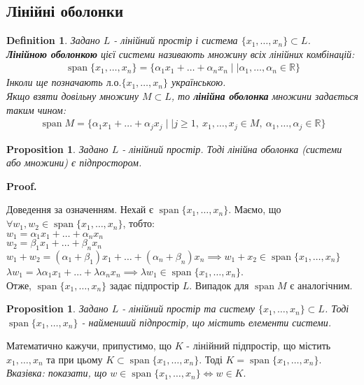 \documentclass[a4paper, 10pt]{article}
\makeatletter
\theoremstyle{theoremdd}
\newtheorem{definition}[theorem]{Definition}
\newtheorem{proposition}[theorem]{Proposition}
\DeclareMathOperator{\linspan}{span}
\renewenvironment{proof}[1][Proof.\\]{\par
\pushQED{\hfill \qed}%
\normalfont \topsep6\p@\@plus6\p@\relax
\trivlist
\item\relax
{\bfseries
#1\@addpunct{.}}\hspace\labelsep\ignorespaces
}{%
\popQED\endtrivlist\@endpefalse
}
\makeatother
\begin{document}
	\subsection{Лінійні оболонки}
	\begin{definition}
	Задано $L$ - лінійний простір і система $\{x_1, \dots, x_n\} \subset L$.\\
	\textbf{Лінійною оболонкою} цієї системи називають множину всіх лінійних комбінацій:
	\begin{align*}
	\linspan\{x_1, \dots, x_n\} = \{\alpha_1 x_1 + \dots + \alpha_n x_n \mid| \alpha_1, \dots, \alpha_n \in \mathbb{R}\}
	\end{align*}
	Інколи ще позначають $\text{л.о.}\{x_1,\dots,x_n\}$ українською.\\
	Якщо взяти довільну множину $M \subset L$, то \textbf{лінійна оболонка} множини задається таким чином:
	\begin{align*}
	\linspan M = \{\alpha_1 x_1 + \dots + \alpha_j x_j \mid| j \geq 1,\ x_1,\dots,x_j \in M,\ \alpha_1, \dots, \alpha_j \in \mathbb{R}\}
	\end{align*}
	\end{definition}
	
	\begin{proposition}
	Задано $L$ - лінійний простір. Тоді лінійна оболонка (системи або множини) є підпростором.
	\end{proposition}
	
	\begin{proof}
	Доведення за означенням. Нехай є $\linspan\{x_1, \dots, x_n\}$. Маємо, що $\forall w_1, w_2 \in \linspan\{x_1, \dots, x_n\}$, тобто:\\
	$w_1 = \alpha_1 x_1 + \dots + \alpha_n x_n$\\
	$w_2 = \beta_1 x_1 + \dots + \beta_n x_n$\\
	$w_1 + w_2 = (\alpha_1 + \beta_1)x_1 + \dots + (\alpha_n + \beta_n)x_n \implies w_1 + x_2 \in \linspan\{x_1, \dots, x_n\}$\\
	$\lambda w_1 = \lambda \alpha_1 x_1 + \dots + \lambda \alpha_n x_n \implies \lambda w_1 \in \linspan\{x_1, \dots, x_n\}$.\\
	Отже, $\linspan\{x_1, \dots, x_n\}$ задає підпростір $L$. Випадок для $\linspan M$ є аналогічним.
	\end{proof} 
	
	\begin{proposition}
	Задано $L$ - лінійний простір та систему $\{x_1,\dots,x_n\} \subset L$. Тоді $\linspan \{x_1,\dots,x_n \}$ - найменший підпростір, що містить елементи системи.
	\end{proposition}
	\noindent
Математично кажучи, припустимо, що $K$ - лінійний підпростір, що містить $x_1,\dots,x_n$ та при цьому $K \subset \linspan \{x_1,\dots,x_n \}$. Тоді $K = \linspan \{x_1,\dots,x_n \}$.\\
	\textit{Вказівка: показати, що} $w \in \linspan\{x_1,\dots,x_n \} \iff w \in K$.
	
\end{document}
